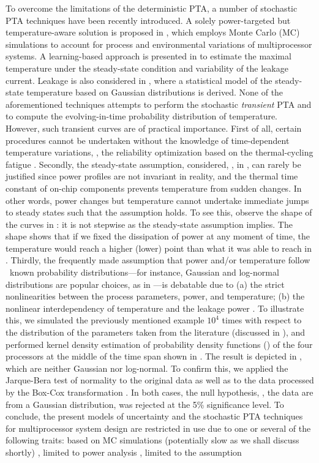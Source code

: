 To overcome the limitations of the deterministic PTA, a number of stochastic PTA techniques have been recently introduced. A solely power-targeted but temperature-aware solution is proposed in \cite{chandra2010}, which employs Monte Carlo (MC) simulations to account for process and environmental variations of multiprocessor systems. A learning-based approach is presented in \cite{juan2011} to estimate the maximal temperature under the steady-state condition and variability of the leakage current. Leakage is also considered in \cite{juan2012}, where a statistical model of the steady-state temperature based on Gaussian distributions is derived. None of the aforementioned techniques attempts to perform the stochastic \emph{transient} PTA and to compute the evolving-in-time probability distribution of temperature. However, such transient curves are of practical importance. First of all, certain procedures cannot be undertaken without the knowledge of time-dependent temperature variations, \eg, the reliability optimization based on the thermal-cycling fatigue \cite{ukhov2012}. Secondly, the steady-state assumption, considered, \eg, in \cite{juan2011, juan2012}, can rarely be justified since power profiles are not invariant in reality, and the thermal time constant of on-chip components prevents temperature from sudden changes. In other words, power changes but temperature cannot undertake immediate jumps to steady states such that the assumption holds. To see this, observe the shape of the curves in : it is not stepwise as the steady-state assumption implies. The shape shows that if we fixed the dissipation of power at any moment of time, the temperature would reach a higher (lower) point than what it was able to reach in . Thirdly, the frequently made assumption that power and/or temperature follow \apriori\ known probability distributions---for instance, Gaussian and log-normal distributions are popular choices, as in \cite{juan2012, srivastava2010}---is debatable due to (a) the strict nonlinearities between the process parameters, power, and temperature; (b) the nonlinear interdependency of temperature and the leakage power \cite{liu2007}. To illustrate this, we simulated the previously mentioned example $10^4$ times with respect to the distribution of the parameters taken from the literature (discussed in ), and performed kernel density estimation of probability density functions (\pdfs) of the four processors at the middle of the time span shown in . The result is depicted in , which are neither Gaussian nor log-normal. To confirm this, we applied the Jarque-Bera test \cite{juan2012} of normality to the original data as well as to the data processed by the Box-Cox transformation \cite{juan2012}. In both cases, the null hypothesis, \ie, the data are from a Gaussian distribution, was rejected at the 5\% significance level. To conclude, the present models of uncertainty and the stochastic PTA techniques for multiprocessor system design are restricted in use due to one or several of the following traits: based on MC simulations (potentially slow as we shall discuss shortly) \cite{chandra2010}, limited to power analysis \cite{chandra2010}, limited to the assumption 